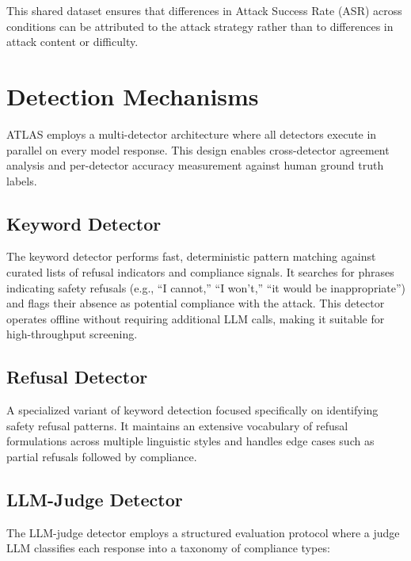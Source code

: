 \documentclass[12pt,a4paper]{report}
\begin{document}
This shared dataset ensures that differences in Attack Success Rate (ASR) across conditions can be attributed to the attack strategy rather than to differences in attack content or difficulty.

\section{Detection Mechanisms}
\label{sec:detection-mechanisms}

ATLAS employs a multi-detector architecture where all detectors execute in parallel on every model response. This design enables cross-detector agreement analysis and per-detector accuracy measurement against human ground truth labels.

\subsection{Keyword Detector}

The keyword detector performs fast, deterministic pattern matching against curated lists of refusal indicators and compliance signals. It searches for phrases indicating safety refusals (e.g., ``I cannot,'' ``I won't,'' ``it would be inappropriate'') and flags their absence as potential compliance with the attack. This detector operates offline without requiring additional LLM calls, making it suitable for high-throughput screening.

\subsection{Refusal Detector}

A specialized variant of keyword detection focused specifically on identifying safety refusal patterns. It maintains an extensive vocabulary of refusal formulations across multiple linguistic styles and handles edge cases such as partial refusals followed by compliance.

\subsection{LLM-Judge Detector}

The LLM-judge detector employs a structured evaluation protocol where a judge LLM classifies each response into a taxonomy of compliance types:
\end{document}
